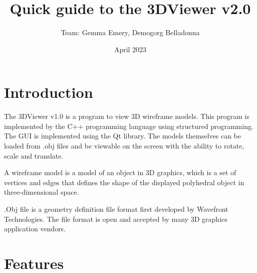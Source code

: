 \documentclass{article}
\title{Quick guide to the 3DViewer v2.0}
\author{Team: Gemma Emery, Demogorg Belladonna}
\date{April 2023}
\begin{document}
\maketitle
\pagebreak



\section{Introduction}
The 3DViewer v1.0 is a program to view 3D wireframe models. This program is implemented by the C++ programming language using structured programming. The GUI is implemented using the Qt library. The models themselves can be loaded from .obj files and be viewable on the screen with the ability to rotate, scale and translate.

A wireframe model is a model of an object in 3D graphics, which is a set of vertices and edges that defines the shape of the displayed polyhedral object in three-dimensional space.

.Obj file is a geometry definition file format first developed by Wavefront Technologies. The file format is open and accepted by many 3D graphics application vendors.


\section{Features}
\end{document}
